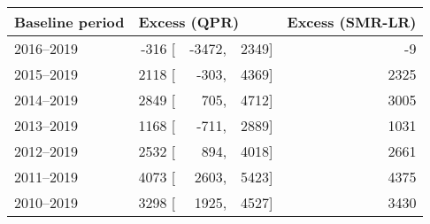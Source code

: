 \begin{tabular}{lrrrr} 
\hline
Baseline period & \multicolumn{3}{l}{Excess (QPR)} & Excess (SMR-LR) \\ 
\hline
2016--2019    &    -316 [ & -3472, & 2349]   &   -9 \\ 
2015--2019    &    2118 [ & -303, & 4369]   &   2325 \\ 
2014--2019    &    2849 [ & 705, & 4712]   &   3005 \\ 
2013--2019    &    1168 [ & -711, & 2889]   &   1031 \\ 
2012--2019    &    2532 [ & 894, & 4018]   &   2661 \\ 
2011--2019    &    4073 [ & 2603, & 5423]   &   4375 \\ 
2010--2019    &    3298 [ & 1925, & 4527]   &   3430 \\ 
\hline
\end{tabular}
